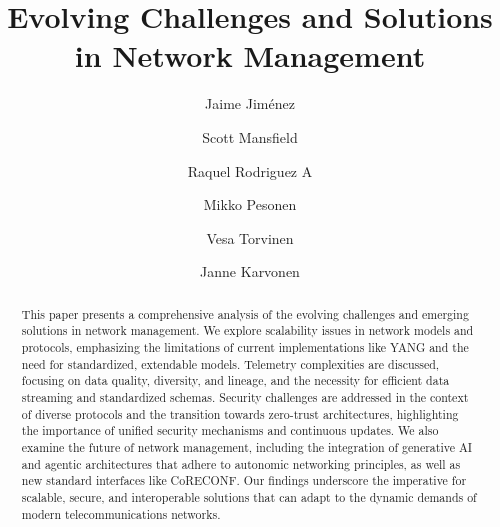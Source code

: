 \documentclass[10pt,sigconf]{iabart}
\begin{document}
\title{Evolving Challenges and Solutions in Network Management}


\author{Jaime Jiménez}

\author{Scott Mansfield}

\author{Raquel Rodriguez A}

\author{Mikko Pesonen}

\author{Vesa Torvinen}

\author{Janne Karvonen}


\begin{abstract}

This paper presents a comprehensive analysis of the evolving challenges and emerging solutions in network management. We explore scalability issues in network models and protocols, emphasizing the limitations of current implementations like YANG and the need for standardized, extendable models. Telemetry complexities are discussed, focusing on data quality, diversity, and lineage, and the necessity for efficient data streaming and standardized schemas. Security challenges are addressed in the context of diverse protocols and the transition towards zero-trust architectures, highlighting the importance of unified security mechanisms and continuous updates. We also examine the future of network management, including the integration of generative AI and agentic architectures that adhere to autonomic networking principles, as well as new standard interfaces like CoRECONF. Our findings underscore the imperative for scalable, secure, and interoperable solutions that can adapt to the dynamic demands of modern telecommunications networks.

\end{abstract}
\end{document}
